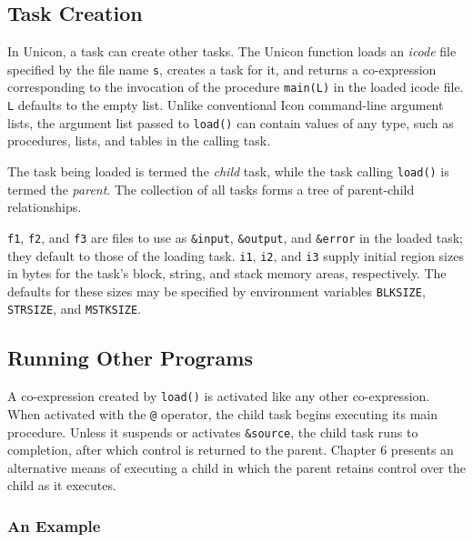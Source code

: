 \subsection{Task Creation}

In Unicon, a task can create other tasks.  The Unicon function
\noindent loads an {\em icode\/} file \cite{Griswold86} specified by
the file name {\tt s}, creates a task for it, and returns a
co-expression corresponding to the invocation of the procedure
{\tt main(L)} in the loaded icode file. {\tt L} defaults to the empty list.
Unlike conventional Icon command-line argument lists, the argument list
passed to {\tt load()} can contain values of any type, such as procedures,
lists, and tables in the calling task.

The task being loaded is termed the {\em child\/} task, while
the task calling {\tt load()} is termed the {\em parent\/}.  The
collection of all tasks forms a tree of parent-child relationships.

{\tt f1}, {\tt f2}, and {\tt f3} are files to use as
{\tt \&input}, {\tt \&output}, and {\tt \&error} in the loaded
task; they default to those of the loading task.  {\tt i1}, {\tt i2},
and {\tt i3} supply initial region sizes in bytes for the
task's block, string, and stack memory areas, respectively. 
The defaults for these sizes may be specified by environment variables
{\tt BLKSIZE}, {\tt STRSIZE}, and {\tt MSTKSIZE}.

\subsection{Running Other Programs}

A co-expression created by {\tt load()} is activated like any other
co-expression. When activated with the {\tt @} operator, the child
task begins executing its main procedure. Unless it suspends or
activates {\tt \&source},
the child task runs to completion, after which control is returned
to the parent.  Chapter 6 presents an alternative means of executing
a child in which the parent retains control over the child as it executes.

\subsubsection*{An Example}

